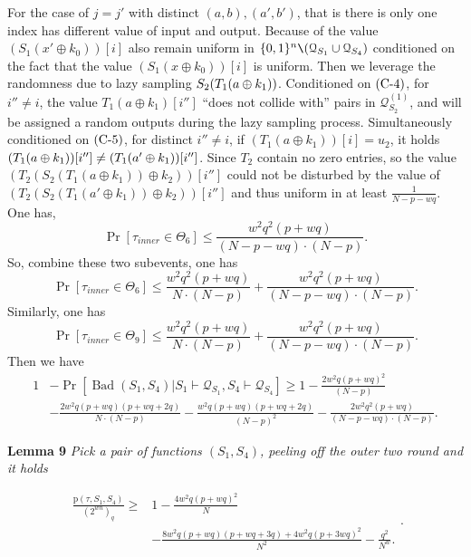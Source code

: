 For the case of $j=j'$ with distinct $(a,b),(a',b')$, that is there is only one index has different value of input and output. Because of the value $\left(S_{1}\left(x' \oplus k_{0}\right)\right)[i]$ also remain uniform in $\{0, 1\}^{n} \verb|\| (\mathcal{Q}_{S_{1}} \cup \mathcal{Q}_{S_{4}})$ conditioned on the fact that the value $\left(S_{1}\left(x \oplus k_{0}\right)\right)[i]$ is uniform. Then we leverage the randomness due to lazy sampling $S_2(T_1(a\oplus k_1))$. Conditioned on $\text{(C-4)}$, for $i''\neq i$, the value $T_1(a \oplus k_1)[i'']$ ``does not collide with'' pairs in $\mathcal{Q}_{S_{2}}^{(1)}$, and will be assigned a random outputs during the lazy sampling process. Simultaneously conditioned on $\text{(C-5)}$, for distinct $i'' \neq i$, if $(T_1\left(a \oplus k_{1}\right))[i] = u_2$, it holds $(T_1(a\oplus k_1))[i'']\neq(T_1(a'\oplus k_1))[i'']$. Since $T_2$ contain no zero entries, so the value $\left(T_{2}\left(S_{2}\left(T_1\left(a \oplus k_{1}\right)\right) \oplus k_{2}\right)\right)[i'']$ could not be disturbed by the value of $\left(T_{2}\left(S_{2}\left(T_1\left(a' \oplus k_{1}\right)\right) \oplus k_{2}\right)\right)[i'']$ and thus uniform in at least
$\frac{1}{N - p- wq}$. One has,
$$
\operatorname{Pr}\left[\tau_{inner} \in \Theta_{6}\right] \leq \frac{w^{2} q^{2} (p+w q)}{(N- p- wq) \cdot (N-p)}.
$$
\noindent So, combine these two subevents, one has
$$
\operatorname{Pr}\left[\tau_{inner} \in \Theta_{6}\right] \leq \frac{w^{2} q^{2} (p+w q)}{N \cdot (N-p)} + \frac{w^{2} q^{2} (p+w q)}{(N- p- wq) \cdot (N- p)}.
$$
\noindent Similarly, one has
$$
\operatorname{Pr}\left[\tau_{inner} \in \Theta_{9}\right] \leq \frac{w^{2} q^{2} (p+w q)}{N \cdot (N-p)} + \frac{w^{2} q^{2} (p+w q)}{(N- p- wq) \cdot (N-p)}.
$$
\noindent Then we have
$$
\begin{aligned}
1&-\operatorname{Pr}\left[\operatorname{Bad}\left(S_{1},S_{4}\right) | S_{1} \vdash \mathcal{Q}_{S_{1}},S_{4} \vdash \mathcal{Q}_{S_{4}}\right] \geq 1- \frac{2 w^{2} q (p+w q)^{2}}{(N-p)}\\
& -\frac{2 w^{2} q (p+w q)(p+w q+2 q)}{N \cdot (N-p)} - \frac{w^{2} q (p+w q)(p+w q+2 q)}{(N-p)^2} - \frac{2 w^{2} q^{2} (p+w q)}{(N- p- wq) \cdot (N-p)}.
\end{aligned}
$$

\noindent \textbf{Lemma 9} \emph{Pick a pair of functions $(S_{1}, S_{4})$, peeling off the outer two round and it holds}

\begin{equation}
\begin{aligned}
\frac{\mathrm{p}\left(\tau, S_{1}, S_{4}\right)}{\left(2^{w n}\right)_{q}} \geq &1- \frac{4 w^2 q(p+wq)^2}{N}\\
&- \frac{8 w^2 q(p+w q)(p+w q +3 q)+4 w^2 q(p+3 wq)^2}{N^2} -\frac{q^2}{N^w}.\end{aligned}.
\end{equation}

